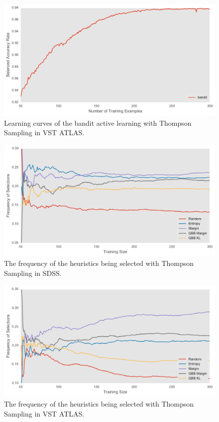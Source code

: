 \begin{figure}[tbp]
	\centering
	\includegraphics[width=\textwidth]{figures/bandit_lc_vst}
	\caption{Learning curves of the bandit active learning with Thompson Sampling in VST ATLAS.}
	\label{fig:bandit_lc_vst} 
\end{figure}

\begin{figure}[tbp]
	\centering
	\includegraphics[width=\textwidth]{figures/bandit_sel_sdss}
	\caption{The frequency of the heuristics being selected with Thompson Sampling in SDSS.}
	\label{fig:bandit_sel_sdss} 
\end{figure}

\begin{figure}[tbp]
	\centering
	\includegraphics[width=\textwidth]{figures/bandit_sel_vst}
	\caption{The frequency of the heuristics being selected with Thompson Sampling in VST ATLAS.}
	\label{fig:bandit_sel_vst} 
\end{figure}



